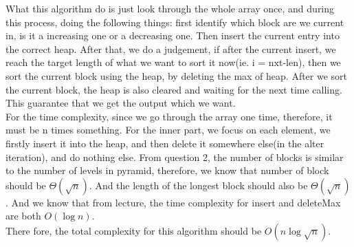 \documentclass[12pt]{article}
\begin{document}
	What this algorithm do is just look through the whole array once, and during this process, doing the following things: first identify which block are we current in, is it a increasing one or a decreasing one. Then insert the current entry into the correct heap. After that, we do a judgement, if after the current insert, we reach the target length of what we want to sort it now(ie. i = nxt-len), then we sort the current block using the heap, by deleting the max of heap. After we sort the current block, the heap is also cleared and waiting for the next time calling. This guarantee that we get the output which we want.\\
	
	For the time complexity, since we go through the array one time, therefore, it must be n times something. For the inner part, we focus on each element, we firstly insert it into the heap, and then delete it somewhere else(in the alter iteration), and do nothing else. From question 2, the number of blocks is similar to the number of levels in pyramid, therefore, we know that number of block should be $\Theta(\sqrt{n})$. And the length of the longest block should also be $\Theta(\sqrt{n})$. And we know that from lecture, the time complexity for insert and deleteMax are both $O(\log n)$. \\
	\indent There fore, the total complexity for this algorithm should be $O(n\log {\sqrt{n}})$.
	
	
\end{document}
